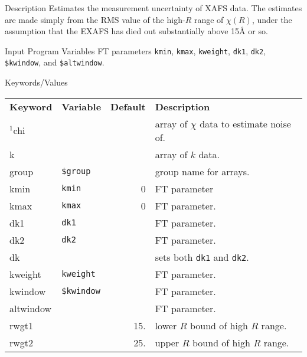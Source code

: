 \begin{IFFcom}
\item[Description] Estimates the measurement uncertainty of XAFS data.  The
  estimates are made simply from the RMS value of the high-$R$ range of
  $\chi(R)$, under the assumption that the EXAFS has died out substantially
  above 15{\AA} or so.
\item[Input Program Variables] FT parameters {\tt{kmin}}, {\tt{kmax}},
  {\tt{kweight}}, {\tt{dk1}}, {\tt{dk2}}, {\tt{\$kwindow}}, and
  {\tt{\$altwindow}}.

\item[Keywords/Values] 
{\relax \hspace{0.25truein}\par\noindent\relax}
\begin{tabular}{llrl}
  \textbf{Keyword} & \textbf{Variable} & \textbf{Default} &
  \textbf{Description}\\
  \noalign{\smallskip}
  ${}^1${chi}&  &  & array of $\chi$ data to estimate noise of.\\
  k          &  &  & array of $k$ data. \\
  group      & {\tt{\$group}} & & group name for arrays. \\ 
  kmin       & {\tt{kmin}} & 0& FT parameter  \\ 
  kmax       & {\tt{kmax}} & 0& FT parameter.  \\ 
  dk1        & {\tt{dk1}}  &  & FT parameter.  \\ 
  dk2        & {\tt{dk2}}  &  & FT parameter.  \\ 
  dk         &             &  & sets both {\tt{dk1}} and {\tt{dk2}}.\\  
  kweight    & {\tt{kweight}} &  & FT parameter.  \\ 
  kwindow    & {\tt{\$kwindow}}& & FT parameter.  \\ 
  altwindow  &  &               & FT parameter.  \\ 
  rwgt1      &  & 15. & lower $R$ bound of high $R$ range.  \\ 
  rwgt2      &  & 25. & upper $R$ bound of high $R$ range.  \\ 
\end{tabular}
\noindent


\end{IFFcom}
